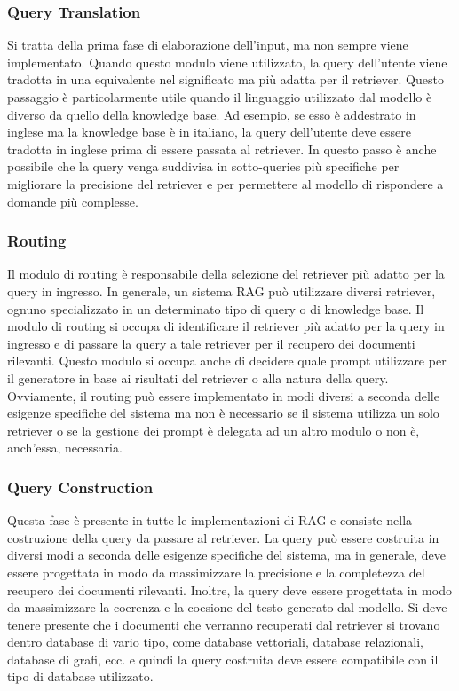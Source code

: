 \subsubsection{Query Translation}
Si tratta della prima fase di elaborazione dell'input, ma non sempre viene implementato. Quando questo modulo viene utilizzato, la query dell'utente viene tradotta in una equivalente nel significato ma più adatta per il retriever. Questo passaggio è particolarmente utile quando il linguaggio utilizzato dal modello è diverso da quello della knowledge base. Ad esempio, se esso è addestrato in inglese ma la knowledge base è in italiano, la query dell'utente deve essere tradotta in inglese prima di essere passata al retriever. In questo passo è anche possibile che la query venga suddivisa in sotto-queries più specifiche per migliorare la precisione del retriever e per permettere al modello di rispondere a domande più complesse.

\subsubsection{Routing}
Il modulo di routing è responsabile della selezione del retriever più adatto per la query in ingresso. In generale, un sistema RAG può utilizzare diversi retriever, ognuno specializzato in un determinato tipo di query o di knowledge base. Il modulo di routing si occupa di identificare il retriever più adatto per la query in ingresso e di passare la query a tale retriever per il recupero dei documenti rilevanti. Questo modulo si occupa anche di decidere quale prompt utilizzare per il generatore in base ai risultati del retriever o alla natura della query. Ovviamente, il routing può essere implementato in modi diversi a seconda delle esigenze specifiche del sistema ma non è necessario se il sistema utilizza un solo retriever o se la gestione dei prompt è delegata ad un altro modulo o non è, anch'essa, necessaria.

\subsubsection{Query Construction}
Questa fase è presente in tutte le implementazioni di RAG e consiste nella costruzione della query da passare al retriever. La query può essere costruita in diversi modi a seconda delle esigenze specifiche del sistema, ma in generale, deve essere progettata in modo da massimizzare la precisione e la completezza del recupero dei documenti rilevanti. Inoltre, la query deve essere progettata in modo da massimizzare la coerenza e la coesione del testo generato dal modello. Si deve tenere presente che i documenti che verranno recuperati dal retriever si trovano dentro database di vario tipo, come database vettoriali, database relazionali, database di grafi, ecc. e quindi la query costruita deve essere compatibile con il tipo di database utilizzato.

